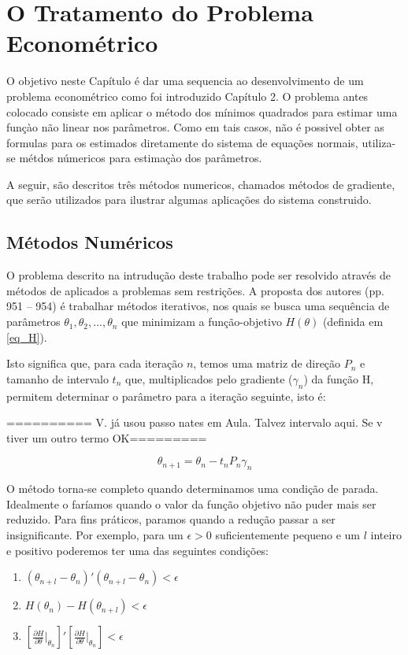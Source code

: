 \documentclass{abnt}
\begin{document}
\chapter{O Tratamento do Problema Econométrico}

O objetivo neste Capítulo é dar uma sequencia ao desenvolvimento de um problema econométrico como foi introduzido Capítulo 2. O problema antes colocado consiste em aplicar o método dos mínimos quadrados para estimar uma funçào não linear nos parâmetros. Como em tais casos, não é possivel obter as formulas para os estimados diretamente do sistema de equações normais, utiliza-se métdos númericos para estimaçào dos parâmetros. 

A seguir, são descritos três métodos numericos, chamados métodos de gradiente, que serão utilizados para ilustrar algumas aplicações do sistema construido.

\section {Métodos Numéricos}

	O problema descrito na intrudução deste trabalho pode ser resolvido através de métodos de aplicados a problemas sem restrições. A proposta dos autores (pp. 951 -- 954) é trabalhar métodos iterativos, nos quais se busca uma sequência de parâmetros $\theta_{1}, \theta_{2}, ... , \theta_{n}$ que minimizam a função-objetivo  $H(\theta)$ (definida em \ref{eq_H}).

	Isto significa que, para cada iteração $n$, temos uma matriz de direção $P_{n}$ e tamanho de intervalo $t_{n}$ que, multiplicados pelo gradiente ($\gamma_{n}$) da função H,  permitem determinar o parâmetro para a iteração seguinte, isto é:

========== V. já usou passo nates em Aula. Talvez intervalo aqui. Se v tiver um outro termo OK=========

\[ \theta_{n+1} = \theta_{n} - t_{n}P_{n}\gamma_{n} \]

	O método torna-se completo quando determinamos uma condição de parada. Idealmente o faríamos quando o valor da função objetivo não puder mais ser reduzido. Para fins práticos, paramos quando a redução passar a ser insignificante. Por exemplo,  para um $\epsilon > 0$ suficientemente pequeno e um $l$ inteiro e positivo poderemos ter uma das seguintes condições:

\begin{enumerate}
\item $ ( \theta_{n+l} - \theta_n )'( \theta_{n+l} - \theta_n ) < \epsilon$
\item $ H(  \theta_n )- H (\theta_{n+l} ) < \epsilon$
\item $  [\frac{\partial H}{\partial \theta}\vert_{\theta_n}]'[\frac{\partial H}{\partial \theta}\vert_{\theta_n}] < \epsilon$
\end{enumerate}
\end{document}
